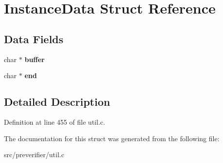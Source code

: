 \section{InstanceData Struct Reference}
\label{struct_instance_data}
\subsection*{Data Fields}
\begin{DoxyCompactItemize}
\item 
char $\ast$ {\bfseries buffer}\label{struct_instance_data_a2dd2a9a45ad4bf21e19f4df311ae2cc8}

\item 
char $\ast$ {\bfseries end}\label{struct_instance_data_a0b791a992e375c68fd41b9c24ea9bfb4}

\end{DoxyCompactItemize}


\subsection{Detailed Description}


Definition at line 455 of file util.c.



The documentation for this struct was generated from the following file:\begin{DoxyCompactItemize}
\item 
src/preverifier/util.c\end{DoxyCompactItemize}
